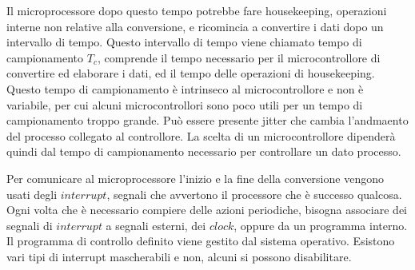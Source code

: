 \documentclass{article}
\numberwithin{equation}{subsection}
\begin{document}
\begin{center}
\end{center}

Il microprocessore dopo questo tempo potrebbe fare housekeeping, operazioni interne non relative alla conversione, e ricomincia a convertire i dati dopo un intervallo di tempo. 
Questo intervallo di tempo viene chiamato tempo di campionamento $T_c$, comprende il tempo necessario per il microcontrollore di convertire ed elaborare i dati, ed il tempo 
delle operazioni di housekeeping. Questo tempo di campionamento è intrinseco al microcontrollore e non è variabile, per cui alcuni microcontrollori sono poco utili per 
un tempo di campionamento troppo grande. Può essere presente jitter che cambia l'andmaento del processo collegato al controllore. La scelta di un microcontrollore dipenderà 
quindi dal tempo di campionamento necessario per controllare un dato processo. 



Per comunicare al microprocessore l'inizio e la fine della conversione vengono usati degli $interrupt$, segnali che avvertono il processore che è successo qualcosa. Ogni 
volta che è necessario compiere delle azioni periodiche, bisogna associare dei segnali di $interrupt$ a segnali esterni, dei $clock$, oppure da un programma interno. Il 
programma di controllo definito viene gestito dal sistema operativo. Esistono vari tipi di interrupt mascherabili e non, alcuni si possono disabilitare. 
\end{document}
